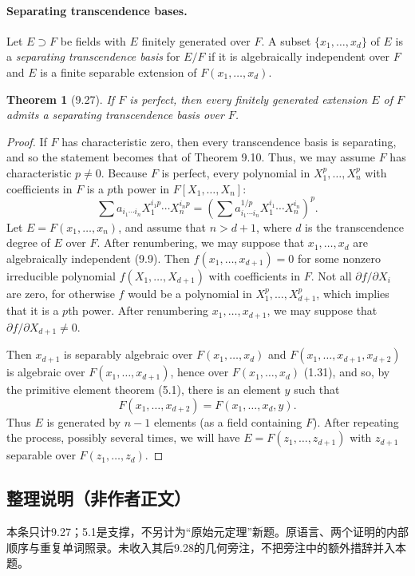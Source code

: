 \documentclass[UTF8,11pt]{ctexart}
\newtheorem*{theorem}{Theorem}
\theoremstyle{definition}
\begin{document}
\paragraph{Separating transcendence bases.}
Let $E\supset F$ be fields with $E$ finitely generated over $F$. A subset $\{x_1,\ldots,x_d\}$ of $E$ is a \emph{separating transcendence basis} for $E/F$ if it is algebraically independent over $F$ and $E$ is a finite separable extension of $F(x_1,\ldots,x_d)$.

\begin{theorem}[9.27]
If $F$ is perfect, then every finitely generated extension $E$ of $F$ admits a separating transcendence basis over $F$.
\end{theorem}
\begin{proof}
If $F$ has characteristic zero, then every transcendence basis is separating, and so the statement becomes that of Theorem 9.10. Thus, we may assume $F$ has characteristic $p\ne0$. Because $F$ is perfect, every polynomial in $X_1^p,\ldots,X_n^p$ with coefficients in $F$ is a $p$th power in $F[X_1,\ldots,X_n]$:
\[\sum a_{i_1\cdots i_n}X_1^{i_1p}\cdots X_n^{i_np}
=\left(\sum a_{i_1\cdots i_n}^{1/p}X_1^{i_1}\cdots X_n^{i_n}\right)^p.\]
Let $E=F(x_1,\ldots,x_n)$, and assume that $n>d+1$, where $d$ is the transcendence degree of $E$ over $F$. After renumbering, we may suppose that $x_1,\ldots,x_d$ are algebraically independent (9.9). Then $f(x_1,\ldots,x_{d+1})=0$ for some nonzero irreducible polynomial $f(X_1,\ldots,X_{d+1})$ with coefficients in $F$. Not all $\partial f/\partial X_i$ are zero, for otherwise $f$ would be a polynomial in $X_1^p,\ldots,X_{d+1}^p$, which implies that it is a $p$th power. After renumbering $x_1,\ldots,x_{d+1}$, we may suppose that $\partial f/\partial X_{d+1}\ne0$.

Then $x_{d+1}$ is separably algebraic over $F(x_1,\ldots,x_d)$ and $F(x_1,\ldots,x_{d+1},x_{d+2})$ is algebraic over $F(x_1,\ldots,x_{d+1})$, hence over $F(x_1,\ldots,x_d)$ (1.31), and so, by the primitive element theorem (5.1), there is an element $y$ such that
\[F(x_1,\ldots,x_{d+2})=F(x_1,\ldots,x_d,y).\]
Thus $E$ is generated by $n-1$ elements (as a field containing $F$). After repeating the process, possibly several times, we will have $E=F(z_1,\ldots,z_{d+1})$ with $z_{d+1}$ separable over $F(z_1,\ldots,z_d)$.
\end{proof}
\subsection*{整理说明（非作者正文）}
本条只计9.27；5.1是支撑，不另计为“原始元定理”新题。原语言、两个证明的内部顺序与重复单词照录。未收入其后9.28的几何旁注，不把旁注中的额外措辞并入本题。
\end{document}
